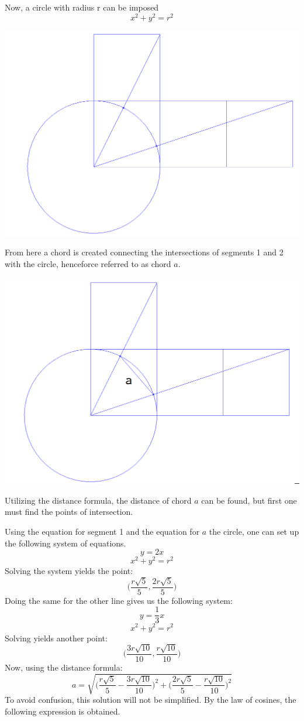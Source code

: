 \documentclass{article}
\begin{document}
Now, a circle with radius r can be imposed $$x^2+y^2=r^2$$
\begin{center}
	\includegraphics[width=.8\linewidth]{circle.png}
\end{center}

\pagebreak
From here a chord is created connecting the intersections of segments 1 and 2 with the circle, henceforce referred to as chord $a$.
\begin{center}
	\includegraphics[width=.8\linewidth]{chord.png}
\end{center}

 Utilizing the distance formula, the distance of chord $a$ can be found, but first one must find the points of intersection. 

Using the equation for segment 1 and the equation for $a$ the circle, one can set up the following system of equations.
$$ y=2x $$
$$ x^2+y^2=r^2 $$
Solving the system yields the point:
$$\bigg(\frac{ r\sqrt{5} }{5}, \frac{ 2r\sqrt{5} }{5}\bigg)$$
Doing the same for the other line gives us the following system:
$$ y=\frac{1}{3}x $$
$$ x^2+y^2=r^2 $$
Solving yields another point: 
$$\bigg(\frac{3r\sqrt{10}}{10}, \frac{r\sqrt{10}}{10}\bigg)$$
Now, using the distance formula:
$$ a=\sqrt{\bigg(\frac{ r\sqrt{5} }{5}-\frac{3r\sqrt{10}}{10}\bigg)^2 + \bigg(\frac{ 2r\sqrt{5} }{5}-\frac{r\sqrt{10}}{10}\bigg)^2}$$
\newline
To avoid confusion, this solution will not be simplified.
By the law of cosines, the following expression is obtained.
\end{document}
